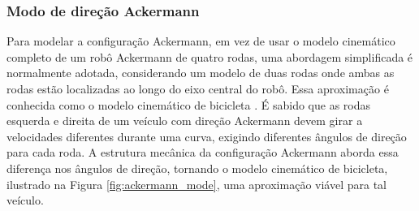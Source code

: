 
\subsubsection{Modo de direção Ackermann}
    \label{subsec:ackermann_mode}
    
    Para modelar a configuração Ackermann, em vez de usar o modelo cinemático completo de um robô Ackermann de quatro rodas, uma abordagem simplificada é normalmente adotada, considerando um modelo de duas rodas onde ambas as rodas estão localizadas ao longo do eixo central do robô. Essa aproximação é conhecida como o modelo cinemático de bicicleta \cite{Sarcinelli-Filho2023_2}. É sabido que as rodas esquerda e direita de um veículo com direção Ackermann devem girar a velocidades diferentes durante uma curva, exigindo diferentes ângulos de direção para cada roda. A estrutura mecânica da configuração Ackermann aborda essa diferença nos ângulos de direção, tornando o modelo cinemático de bicicleta, ilustrado na Figura \ref{fig:ackermann_mode}, uma aproximação viável para tal veículo.
    
